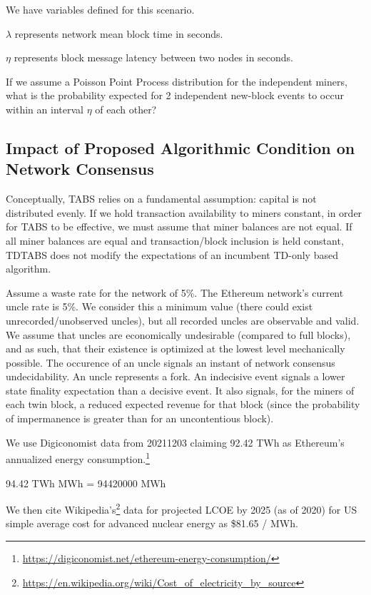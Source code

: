 \documentclass[11pt]{article}
\theoremstyle{plain}
\begin{document}
We have variables defined for this scenario.

$\lambda$ represents network mean block time in seconds.

$\eta$ represents block message latency between two nodes in seconds.

If we assume a Poisson Point Process distribution for the independent miners,
what is the probability expected for 2 independent new-block events to occur
within an interval $\eta$ of each other?


\subsection{\normalsize{Impact of Proposed Algorithmic Condition on Network
Consensus}}

Conceptually, TABS relies on a fundamental assumption: capital is not
distributed evenly.
If we hold transaction availability to miners constant, in order for TABS to be
effective, we must assume that miner balances are not equal.
If all miner balances are equal and transaction/block inclusion is held
constant, TDTABS does not modify the expectations of an incumbent TD-only based
algorithm.

Assume a waste rate for the network of 5\%.
The Ethereum network's current uncle rate is 5\%. We consider this a minimum
value (there could exist unrecorded/unobserved uncles), but all recorded uncles
are observable and valid.
We assume that uncles are economically undesirable (compared to full blocks),
and as such, that their existence is optimized at the lowest level mechanically
possible.
The occurence of an uncle signals an instant of network consensus
undecidability.
An uncle represents a fork.
An indecisive event signals a lower state finality expectation than a decisive
event.
It also signals, for the miners of each twin block, a reduced expected revenue
for that block (since the probability of impermanence is greater than for an
uncontentious block).

We use Digiconomist data from 20211203 claiming 92.42 TWh as Ethereum's
annualized energy
consumption.\footnote{\url{https://digiconomist.net/ethereum-energy-consumption/}}

94.42 TWh \rightarrow MWh = 94420000 MWh

We then cite
Wikipedia's\footnote{\url{https://en.wikipedia.org/wiki/Cost_of_electricity_by_source}} data for projected LCOE by 2025 (as of 2020) for US simple average cost for
advanced nuclear energy as \$81.65 / MWh.
\end{document}
